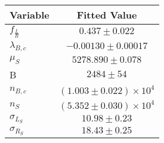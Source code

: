 \begin{tabular}[t]{lc}
\hline
Variable &Fitted Value\\
\hline\hline
$f_{\frac{L}{R}}$&$0.437\pm0.022$\\
\hline
$\lambda_{B,c}$&$-0.00130\pm0.00017$\\
\hline
$\mu_S$&$5278.890\pm0.078$\\
\hline
B&$2484\pm54$\\
\hline
$n_{B,c}$&$(1.003\pm0.022)\times 10^4$\\
\hline
$n_S$&$(5.352\pm0.030)\times 10^4$\\
\hline
$\sigma_{L_S}$&$10.98\pm0.23$\\
\hline
$\sigma_{R_S}$&$18.43\pm0.25$\\
\hline
\end{tabular}